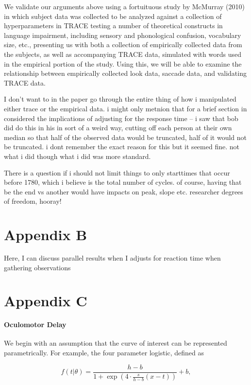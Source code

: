 \documentclass{article}
\begin{document}
We validate our arguments above using a fortuituous study by McMurray (2010) in which subject data was collected to be analyzed against a collection of hyperparameters in TRACE testing a number of theoretical constructs in language impairment, including sensory and phonological confusion, vocabulary size, etc., presenting us with both a collection of empirically collected data from the subjects, as well as accompanying TRACE data, simulated with words used in the empirical portion of the study. Using this, we will be able to examine the relationship between empirically collected look data, saccade data, and validating TRACE data.

I don't want to in the paper go through the entire thing of how i manipulated either trace or the empirical data. i might only metnion that for a brief section in considered the implications of adjusting for the response time -- i saw that bob did do this in his in sort of a weird way, cutting off each person at their own median so that half of the observed data would be truncated, half of it would not be truncated. i dont remember the  exact reason for this but it seemed fine. not what i did though what i did was more standard.

There is a question if i should not limit things to only starttimes that occur before 1780, which i believe is the total number of cycles. of course, having that be the end vs another would have impacts on peak, slope etc. researcher degrees of freedom, hooray! 

\section*{Appendix B}

Here, I can discuss parallel results when I adjusts for reaction time when gathering observations

\section*{Appendix C}

\paragraph{Oculomotor Delay}


We begin with an assumption that the curve of interest can be represented parametrically. For example, the four parameter logistic, defined as

$$
f(t|\theta) = \frac{h-b}{1 + \exp\left(4 \cdot \frac{s}{h-b}(x - t) \right)} +b,
$$ 
\end{document}
